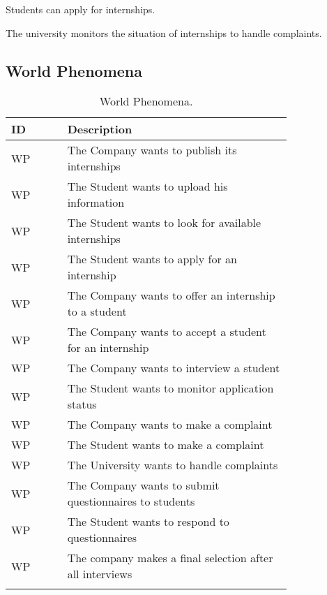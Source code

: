 Students can apply for internships.

The university monitors the situation of internships to handle complaints.

\newpage

\subsection{World Phenomena}
\label{subsec:world_phenomena}%
\setcounter{wp}{1}
\newcommand{\cwp}{\thewp\stepcounter{wp}}
\begin{center}
    \begin{longtable}{ |l|p{0.8\linewidth}| }
        \hline
        \textbf{ID} & \textbf{Description}                                                \\
        \hline
        WP\cwp      & The Company wants to publish its internships\\
        \hline
        WP\cwp      & The Student wants to upload his information \\
        \hline
        WP\cwp      & The Student wants to look for available internships \\
        \hline
        WP\cwp      & The Student wants to apply for an internship \\
        \hline
        WP\cwp      & The Company wants to offer an internship to a student \\
        \hline
        WP\cwp      & The Company wants to accept a student for an internship \\
        \hline
        WP\cwp      & The Company wants to interview a student \\
        \hline
        WP\cwp      & The Student wants to monitor application status \\
        \hline
        WP\cwp      & The Company wants to make a complaint \\
        \hline
        WP\cwp      & The Student wants to make a complaint \\
        \hline
        WP\cwp      & The University wants to handle complaints \\
        \hline
        WP\cwp      & The Company wants to submit questionnaires to students \\
        \hline
        WP\cwp      & The Student wants to respond to questionnaires \\
        \hline
        WP\cwp      & The company makes a final selection after all interviews \\
        \hline
        \caption{World Phenomena.}
        \label{tab:worldph_tab}%
    \end{longtable}
\end{center}

